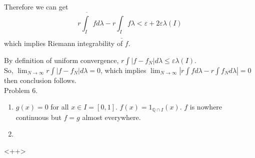 Therefore we can get
\begin{equation*}
	r \overline{\int_I}fd\lambda - r\underline{\int_I}f\lambda < \varepsilon + 2\varepsilon \lambda\left( I \right)
	\label{3}
\end{equation*}
which implies Riemann integrability of $f$.

By definition of uniform convergence, $r\int \left | f - f_N \right | d\lambda \leq \varepsilon \lambda\left( I \right)$.\\
So, $\lim_{N\rightarrow \infty}r\int \left | f - f_N \right | d\lambda = 0$, which implies $\lim_{N\rightarrow \infty}\left | r\int fd\lambda - r\int f_N d\lambda \right | = 0$ then conclusion follows. \\

Problem 6.\\

\begin{enumerate}[label = (\alph*)]
	\item $g(x) = 0$ for all $x \in I = \left[ 0, 1 \right]$. $f(x) = 1_{\mathbb{Q}\cap I}(x)$. $f$ is nowhere continuous but $f = g$ almost everywhere.
	\item

\end{enumerate}<++>
